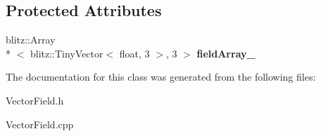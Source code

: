 \subsection*{Protected Attributes}
\begin{DoxyCompactItemize}
\item 
\hypertarget{classVectorField_a8486ba09468bb0e47772be375f938ad5}{blitz\+::\+Array\\*
$<$ blitz\+::\+Tiny\+Vector$<$ float, 3 $>$, 3 $>$ {\bfseries field\+Array\+\_\+}}\label{classVectorField_a8486ba09468bb0e47772be375f938ad5}

\end{DoxyCompactItemize}


The documentation for this class was generated from the following files\+:\begin{DoxyCompactItemize}
\item 
Vector\+Field.\+h\item 
Vector\+Field.\+cpp\end{DoxyCompactItemize}
